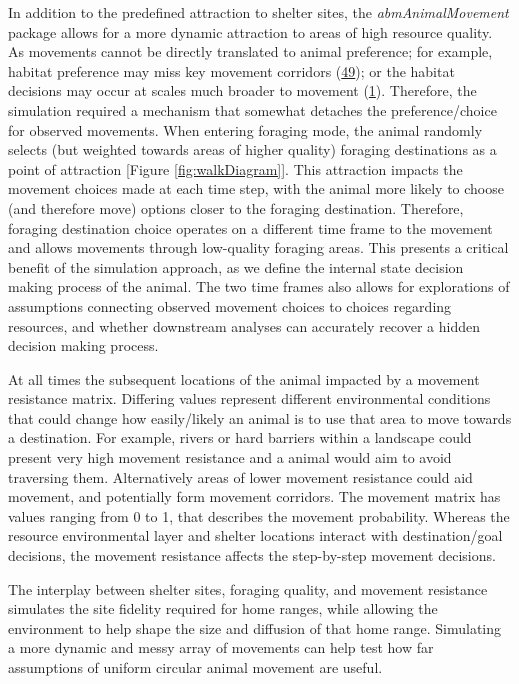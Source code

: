 \documentclass[10pt,a4paper]{article}
\begin{document}
In addition to the predefined attraction to shelter sites, the \emph{abmAnimalMovement} package allows for a more dynamic attraction to areas of high resource quality.
As movements cannot be directly translated to animal preference; for example, habitat preference may miss key movement corridors (\protect\hyperlink{ref-Scharf2018}{49}); or the habitat decisions may occur at scales much broader to movement (\protect\hyperlink{ref-Bastille-Rousseau2017}{1}).
Therefore, the simulation required a mechanism that somewhat detaches the preference/choice for observed movements.
When entering foraging mode, the animal randomly selects (but weighted towards areas of higher quality) foraging destinations as a point of attraction {[}Figure \ref{fig:walkDiagram}{]}.
This attraction impacts the movement choices made at each time step, with the animal more likely to choose (and therefore move) options closer to the foraging destination.
Therefore, foraging destination choice operates on a different time frame to the movement and allows movements through low-quality foraging areas.
This presents a critical benefit of the simulation approach, as we define the internal state decision making process of the animal.
The two time frames also allows for explorations of assumptions connecting observed movement choices to choices regarding resources, and whether downstream analyses can accurately recover a hidden decision making process.

At all times the subsequent locations of the animal impacted by a movement resistance matrix.
Differing values represent different environmental conditions that could change how easily/likely an animal is to use that area to move towards a destination.
For example, rivers or hard barriers within a landscape could present very high movement resistance and a animal would aim to avoid traversing them.
Alternatively areas of lower movement resistance could aid movement, and potentially form movement corridors.
The movement matrix has values ranging from 0 to 1, that describes the movement probability.
Whereas the resource environmental layer and shelter locations interact with destination/goal decisions, the movement resistance affects the step-by-step movement decisions.

The interplay between shelter sites, foraging quality, and movement resistance simulates the site fidelity required for home ranges, while allowing the environment to help shape the size and diffusion of that home range.
Simulating a more dynamic and messy array of movements can help test how far assumptions of uniform circular animal movement are useful.
\end{document}
